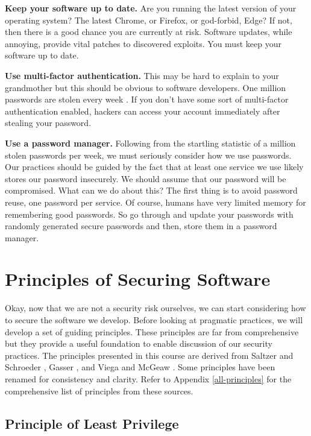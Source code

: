 \textbf{Keep your software up to date.}
Are you running the latest version of your operating system?
The latest Chrome, or Firefox, or god-forbid, Edge?
If not, then there is a good chance you are currently at risk.
Software updates, while annoying, provide vital patches to discovered exploits.
You must keep your software up to date.

\textbf{Use multi-factor authentication.}
This may be hard to explain to your grandmother but this should be obvious to software developers.
One million passwords are stolen every week \cite{password-security}.
If you don't have some sort of multi-factor authentication enabled, hackers can access your account immediately after stealing your password.

\textbf{Use a password manager.}
Following from the startling statistic of a million stolen passwords per week, we must seriously consider how we use passwords.
Our practices should be guided by the fact that at least one service we use likely stores our password insecurely.
We should assume that our password will be compromised.
What can we do about this?
The first thing is to avoid password reuse, one password per service.
Of course, humans have very limited memory for remembering good passwords.
So go through and update your passwords with randomly generated secure passwords and then, store them in a password manager.


\section{Principles of Securing Software}
Okay, now that we are not a security risk ourselves, we can start considering how to secure the software we develop.
Before looking at pragmatic practices, we will develop a set of guiding principles.
These principles are far from comprehensive but they provide a useful foundation to enable discussion of our security practices.
The principles presented in this course are derived from Saltzer and Schroeder \cite{1975-security-design-principles},
Gasser \cite{1988-security-design-principles}, and Viega and McGeaw \cite{2001-security-design-principles}.
Some principles have been renamed for consistency and clarity.
Refer to Appendix \ref{all-principles} for the comprehensive list of principles from these sources. 

\subsection{Principle of Least Privilege}

